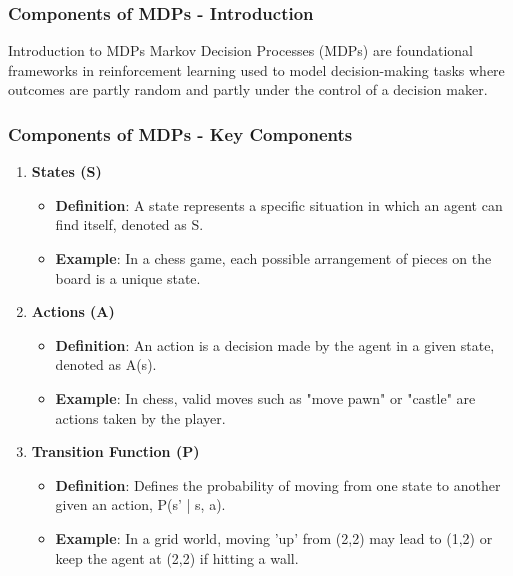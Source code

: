 \documentclass[aspectratio=169]{beamer}
\begin{document}
\begin{frame}[fragile]
  \frametitle{Components of MDPs - Introduction}
  \begin{block}{Introduction to MDPs}
    Markov Decision Processes (MDPs) are foundational frameworks in reinforcement learning used to model decision-making tasks where outcomes are partly random and partly under the control of a decision maker.
  \end{block}
\end{frame}

\begin{frame}[fragile]
  \frametitle{Components of MDPs - Key Components}
  \begin{enumerate}
    \item \textbf{States (S)}
      \begin{itemize}
        \item \textbf{Definition}: A state represents a specific situation in which an agent can find itself, denoted as S.
        \item \textbf{Example}: In a chess game, each possible arrangement of pieces on the board is a unique state.
      \end{itemize}

    \item \textbf{Actions (A)}
      \begin{itemize}
        \item \textbf{Definition}: An action is a decision made by the agent in a given state, denoted as A(s).
        \item \textbf{Example}: In chess, valid moves such as "move pawn" or "castle" are actions taken by the player.
      \end{itemize}

    \item \textbf{Transition Function (P)}
      \begin{itemize}
        \item \textbf{Definition}: Defines the probability of moving from one state to another given an action, P(s' | s, a).
        \item \textbf{Example}: In a grid world, moving 'up' from (2,2) may lead to (1,2) or keep the agent at (2,2) if hitting a wall.
      \end{itemize}
  \end{enumerate}
\end{frame}
\end{document}
